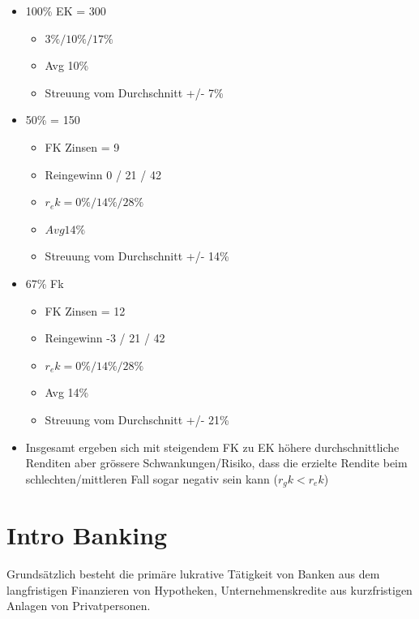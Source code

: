 \begin{itemize}
    \item 100\% EK = 300
    \begin{itemize}
        \item $3\% / 10\% / 17\%$
        \item Avg 10\%
        \item Streuung vom Durchschnitt +/- 7\%
    \end{itemize}
    \item 50\% = 150
    \begin{itemize}
        \item FK Zinsen = 9 
        \item Reingewinn 0 / 21 / 42
        \item $r_ek = 0\% / 14\% / 28\%$
        \item $Avg 14\%$
        \item Streuung vom Durchschnitt +/- 14\%
    \end{itemize}
    \item 67\% Fk
    \begin{itemize}
         \item FK Zinsen = 12 
        \item Reingewinn -3 / 21 / 42
        \item $r_ek = 0\% / 14\% / 28\%$
        \item Avg 14\%
        \item Streuung vom Durchschnitt +/- 21\%
    \end{itemize}
    \item Insgesamt ergeben sich mit steigendem FK zu EK höhere durchschnittliche Renditen aber grössere Schwankungen/Risiko, dass die erzielte Rendite beim schlechten/mittleren Fall sogar negativ sein kann ($r_gk < r_ek$)
\end{itemize}

\section{Intro Banking}
Grundsätzlich besteht die primäre lukrative Tätigkeit von Banken aus dem langfristigen Finanzieren von Hypotheken, Unternehmenskredite aus kurzfristigen Anlagen von Privatpersonen.

